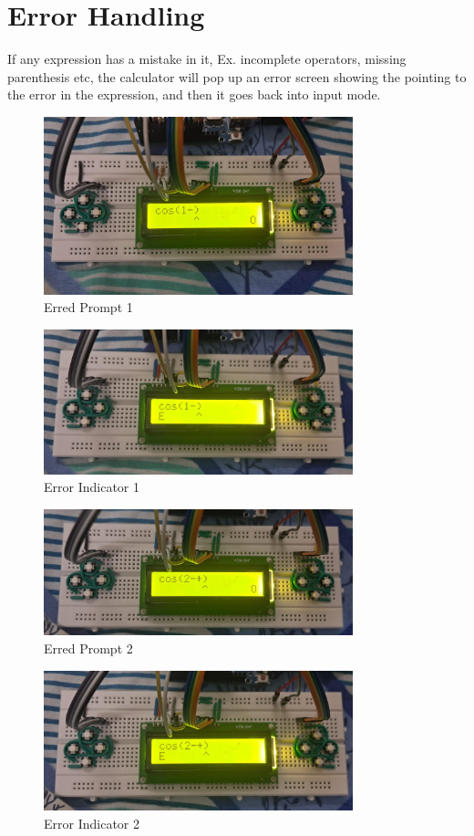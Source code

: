 \documentclass[journal]{IEEEtran}
\begin{document}
	\section{Error Handling}
	If any expression has a mistake in it, Ex. incomplete operators, missing parenthesis etc, the calculator will pop up an error screen showing the pointing to the error in the expression, and then it goes back into input mode. 
	\begin{figure}[h!]
		\centering
		\includegraphics[width=0.8\textwidth]{figs/interp1.jpeg}
		\caption{Erred Prompt 1}
	\end{figure}
			\begin{figure}[h!]
		\centering
		\includegraphics[width=0.8\textwidth]{figs/e1.jpeg}
		\caption{Error Indicator 1}
	\end{figure}
		\begin{figure}[h!]
		\centering
		\includegraphics[width=0.8\textwidth]{figs/interp2.jpeg}
		\caption{Erred Prompt 2}
	\end{figure}
	\begin{figure}[h!]
		\centering
		\includegraphics[width=0.8\textwidth]{figs/e2.jpeg}
		\caption{Error Indicator 2}
	\end{figure}
	\newpage
\end{document}
